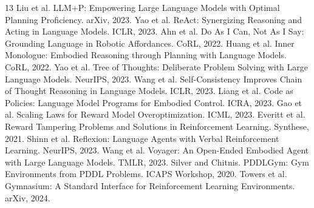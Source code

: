 \documentclass{article}
\begin{document}
\begin{thebibliography}{13}
Liu et al. LLM+P: Empowering Large Language Models with Optimal Planning
Proficiency. arXiv, 2023.
Yao et al. ReAct: Synergizing Reasoning and Acting in Language Models. ICLR,
2023.
Ahn et al. Do As I Can, Not As I Say: Grounding Language in Robotic
Affordances. CoRL, 2022.
Huang et al. Inner Monologue: Embodied Reasoning through Planning with
Language Models. CoRL, 2022.
Yao et al. Tree of Thoughts: Deliberate Problem Solving with Large Language
Models. NeurIPS, 2023.
Wang et al. Self-Consistency Improves Chain of Thought Reasoning in Language
Models. ICLR, 2023.
Liang et al. Code as Policies: Language Model Programs for Embodied Control.
ICRA, 2023.
Gao et al. Scaling Laws for Reward Model Overoptimization. ICML, 2023.
Everitt et al. Reward Tampering Problems and Solutions in Reinforcement
Learning. Synthese, 2021.
Shinn et al. Reflexion: Language Agents with Verbal Reinforcement Learning.
NeurIPS, 2023.
Wang et al. Voyager: An Open-Ended Embodied Agent with Large Language Models.
TMLR, 2023.
Silver and Chitnis. PDDLGym: Gym Environments from PDDL Problems. ICAPS
Workshop, 2020.
Towers et al. Gymnasium: A Standard Interface for Reinforcement Learning
Environments. arXiv, 2024.
\end{thebibliography}
\end{document}
